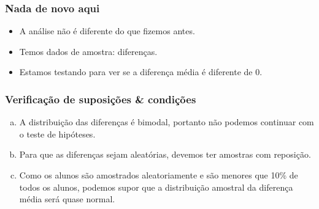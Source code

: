 
\begin{frame}
\frametitle{Nada de novo aqui}

\begin{itemize}
\justifying
\item A análise não é diferente do que fizemos antes.
\justifying
\item Temos dados de  amostra: diferenças.
\justifying
\item Estamos testando para ver se a diferença média é diferente de 0.

\end{itemize}

\end{frame}


\begin{frame}
\frametitle{Verificação de suposições \& condições}
\justifying
{}

\begin{enumerate}[(a)]
\justifying
{}
\justifying
\item A distribuição das diferenças é bimodal, portanto não podemos continuar com o teste de hipóteses.
\justifying
\item Para que as diferenças sejam aleatórias, devemos ter amostras com reposição.
\justifying
\item Como os alunos são amostrados aleatoriamente e são menores que 10\% de todos os alunos, podemos supor que a distribuição amostral da diferença média será quase normal.
\end{enumerate}

\end{frame}


